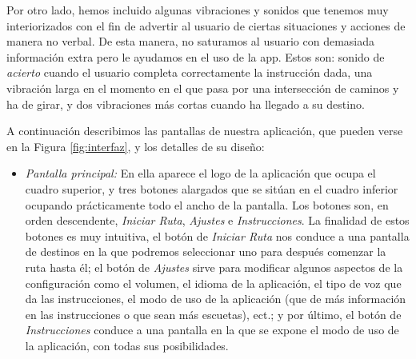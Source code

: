 Por otro lado, hemos incluido algunas vibraciones y sonidos que tenemos muy interiorizados con el fin de advertir al usuario de ciertas situaciones y acciones de manera no verbal. De esta manera, no saturamos al usuario con demasiada información extra pero le ayudamos en el uso de la app. Estos son: sonido de \textit{acierto} cuando el usuario completa correctamente la instrucción dada, una vibración larga en el momento en el que pasa por una intersección de caminos y ha de girar, y dos vibraciones más cortas cuando ha llegado a su destino.

A continuación describimos las pantallas de nuestra aplicación, que pueden verse en la Figura \ref{fig:interfaz}, y los detalles de su diseño:

\begin{itemize}
	\item \textit{Pantalla principal:} En ella aparece el logo de la aplicación que ocupa el cuadro superior, y tres botones alargados que se sitúan en el cuadro inferior ocupando prácticamente todo el ancho de la pantalla. Los botones son, en orden descendente, \textit{Iniciar Ruta}, \textit{Ajustes} e \textit{Instrucciones}. La finalidad de estos botones es muy intuitiva, el botón de \textit{Iniciar Ruta} nos conduce a una pantalla de destinos en la que podremos seleccionar uno para después comenzar la ruta hasta él; el botón de \textit{Ajustes} sirve para modificar algunos aspectos de la configuración como el volumen, el idioma de la aplicación, el tipo de voz que da las instrucciones, el modo de uso de la aplicación (que de más información en las instrucciones o que sean más escuetas), ect.; y por último, el botón de \textit{Instrucciones} conduce a una pantalla en la que se expone el modo de uso de la aplicación, con todas sus posibilidades.
	

\end{itemize}
